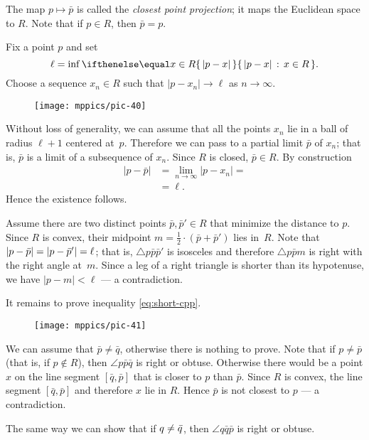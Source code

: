 The map $p\mapsto \bar p$ is called the \emph{closest point projection};
it maps the Euclidean space to $R$.
Note that if $p\in R$, then $\bar p=p$.

Fix a point $p$ and set 
\[\ell=\inf\set{|p-x|}{x\in R}.\]
Choose a sequence $x_n\in R$ such that $|p-x_n|\to \ell$ as $n\to\infty$.

\begin{wrapfigure}{o}{22 mm}
\vskip-0mm
\centering
\texttt{[image: mppics/pic-40]}
\vskip-0mm
\end{wrapfigure}

Without loss of generality, we can assume that all the points $x_n$ lie in a ball of radius $\ell+1$ centered at~$p$.
Therefore we can pass to a partial limit $\bar p$ of $x_n$; that is, $\bar p$ is a limit of a subsequence of $x_n$.
Since $R$ is closed, $\bar p\in R$.
By construction 
\begin{align*}
|p-\bar p|&=\lim_{n\to\infty}|p-x_n|=
\\
&=\ell.
\end{align*}
Hence the existence follows.

Assume there are two distinct points $\bar p, \bar p'\in R$ that minimize the distance to $p$.
Since $R$ is convex, their midpoint $m=\tfrac12\cdot (\bar p+\bar p')$ lies in~$R$.
Note that $|p-\bar p|\z=|p-\bar p'|=\ell$; that is, $\triangle p\bar p\bar p'$ is isosceles and therefore $\triangle p\bar p m$ is right with the right angle at~$m$.
Since a leg of a right triangle is shorter than its hypotenuse, we have $|p-m|<\ell$ --- a contradiction. 

It remains to prove inequality \ref{eq:short-cpp}.

\begin{wrapfigure}{o}{37 mm}
\vskip-0mm
\centering
\texttt{[image: mppics/pic-41]}
\vskip-0mm
\end{wrapfigure}

We can assume that $\bar p\ne\bar q$, otherwise there is nothing to prove.
Note that if $p\ne \bar p$ (that is, if $p\notin R$), 
then $\angle p \bar p \bar q$ is right or obtuse.
Otherwise there would be a point $x$ on the line segment $[\bar q,\bar p]$ that is closer to $p$ than $\bar p$.
Since $R$ is convex, the line segment $[\bar q,\bar p]$ and therefore $x$ lie in $R$.
Hence $\bar p$ is not closest to $p$ --- a contradiction.

The same way we can show that  if $q\z\ne \bar q$, then $\angle q \bar q \bar p$ is right or obtuse.

